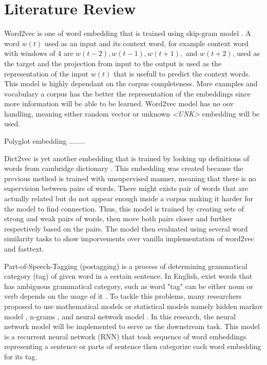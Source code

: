\chapter{Literature Review}
\label{chap:literature}

Word2vec is one of word embedding that is trained using skip-gram
model \citep{Distributed2013mikolov}. A word $w(t)$ used as an input
and its context word, for example context word with windows of 4 are
$w(t-2), w(t-1), w(t+1),$ and $w(t+2)$, used as the target and the
projection from input to the output is used as the representation of
the input $w(t)$ that is usefull to predict the context words. This
model is highly dependant on the corpus completeness. More examples
and vocabulary a corpus has the better the representation of the
embeddings since more information will be able to be learned. Word2vec
model has no oov handling, meaning either random vector or unknown
\textit{\textless UNK\textgreater} embedding will be used.

Polyglot embedding ........

Dict2vec is yet another embedding that is trained by looking up
definitions of words from cambridge dictionary
\cite{tissier2017dict2vec}. This embedding was created because the
previous method is trained with unsupervised manner, meaning that
there is no supervision between pairs of words. There might exists
pair of words that are actually related but do not appear enough
inside a corpus making it harder for the model to find connection.
Thus, this model is trained by creating sets of strong and weak pairs of
words, then move both pairs closer and further respectively based on
the pairs. The model then evaluated using several word similarity
tasks to show imporvements over vanilla implementation of word2vec and
fasttext.

Part-of-Speech-Tagging (postagging) is a process of determining
grammatical category (tag) of given word in a certain sentence. In English,
exist words that has ambiguous grammatical category, such as word
"tag" can be either noun or verb depends on the usage of it
\citep{apractical1992cutting}. To tackle this problems, many
researchers proposed to use mathematical models or statistical models
namely hidden markov model \citep{apractical1992cutting}, n-grams
\citep{tnt2000Brants}, and neural network model
\citep{finding2015ling}. In this research, the neural network model
will be implemented to serve as the downstream task. This model is a
recurrent neural network (RNN) that took sequence of word embeddings
representing a sentence or parts of sentence then categorize each word
embedding for its tag.

